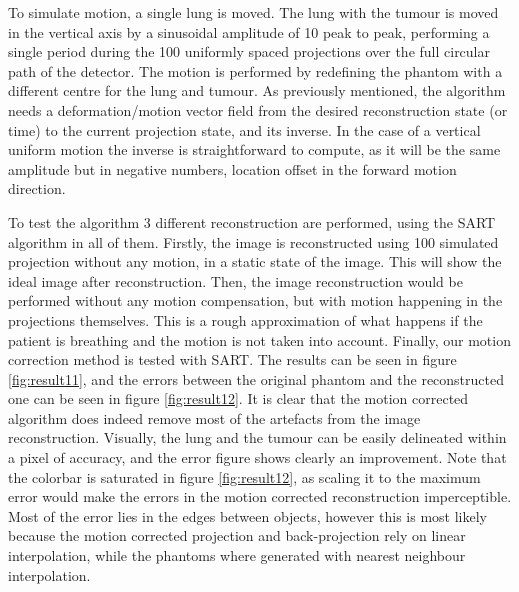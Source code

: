  
To simulate motion, a single lung is moved. The lung with the tumour is moved in the vertical axis by a sinusoidal amplitude of 10 peak to peak, performing a single period during the 100 uniformly spaced projections over the full circular path of the detector. The motion is performed by redefining the phantom with a different centre for the lung and tumour. As previously mentioned, the algorithm needs a deformation/motion vector field from the desired reconstruction state (or time) to the current projection state, and its inverse. In the case of a vertical uniform motion the inverse is straightforward to compute, as it will be the same amplitude but in negative numbers, location offset in the forward motion direction.

To test the algorithm 3 different reconstruction are performed, using the SART algorithm in all of them. Firstly, the image is reconstructed using 100 simulated projection without any motion, in a static state of the image. This will show the ideal image after reconstruction. Then, the image reconstruction would be performed without any motion compensation, but with motion happening in the projections themselves. This is a rough approximation of what happens if the patient is breathing and the motion is not taken into account. Finally, our motion correction method is tested with SART. The results can be seen in figure \ref{fig:result11}, and the errors between the original phantom and the reconstructed one can be seen in figure \ref{fig:result12}. It is clear that the motion corrected algorithm does indeed remove most of the artefacts from the image reconstruction.  Visually, the lung and the tumour can be easily delineated within a pixel of accuracy, and the error figure shows clearly an improvement. Note that the colorbar is saturated in figure \ref{fig:result12}, as scaling it to the maximum error would make the errors in the motion corrected reconstruction imperceptible. Most of the error lies in the edges between objects, however this is most likely because the motion corrected projection and back-projection rely on linear interpolation, while the phantoms where generated with nearest neighbour interpolation.


